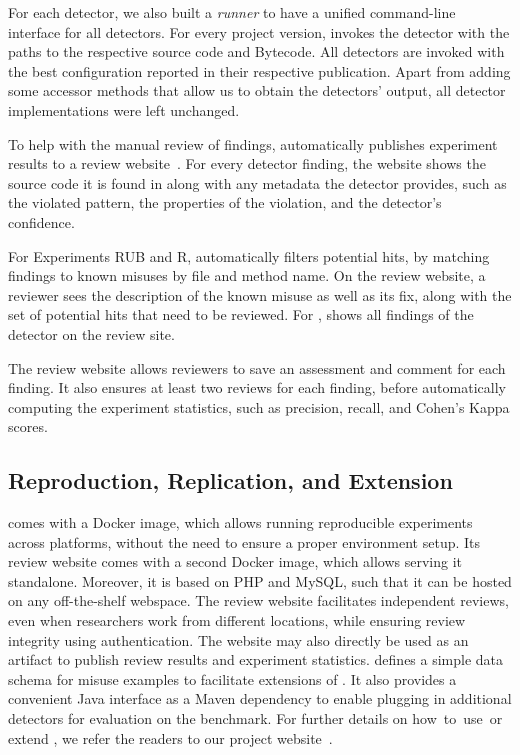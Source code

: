 For each detector, we also built a \emph{runner} to have a unified command-line interface for all detectors.
For every project version, \MUPipe invokes the detector with the paths to the respective source code and Bytecode.
All detectors are invoked with the best configuration reported in their respective publication.
Apart from adding some accessor methods that allow us to obtain the detectors' output, all detector implementations were left unchanged.


To help with the manual review of findings, \MUPipe automatically publishes experiment results to a review website~\cite{artifact-page}.
For every detector finding, the website shows the source code it is found in along with any metadata the detector provides, such as the violated pattern, the properties of the violation, and the detector's confidence.

For Experiments RUB and R, \MUPipe automatically filters potential hits, by matching findings to known misuses by file and method name.
On the review website, a reviewer sees the description of the known misuse as well as its fix, along with the set of potential hits that need to be reviewed.
For , \MUPipe shows all findings of the detector on the review site.

The review website allows reviewers to save an assessment and comment for each finding.
It also ensures at least two reviews for each finding, before automatically computing the experiment statistics, such as precision, recall, and Cohen's Kappa scores.

\subsection{Reproduction, Replication, and Extension}

\MUPipe comes with a Docker image, which allows running reproducible experiments across platforms, without the need to ensure a proper environment setup.
Its review website comes with a second Docker image, which allows serving it standalone.
Moreover, it is based on PHP and MySQL, such that it can be hosted on any off-the-shelf webspace.
The review website facilitates independent reviews, even when researchers work from different locations, while ensuring review integrity using authentication.
The website may also directly be used as an artifact to publish review results and experiment statistics.
\MUPipe defines a simple data schema for misuse examples to facilitate extensions of \MUBench.
It also provides a convenient Java interface as a Maven dependency to enable plugging in additional detectors for evaluation on the benchmark.
For further details on how~to~use~or extend \MUPipe, we refer the readers to our project website~\cite{mubench}.
